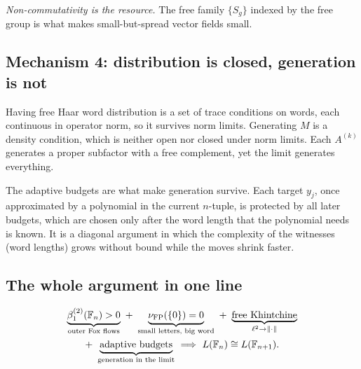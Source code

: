 \emph{Non-commutativity is the resource.} The free family $\{S_g\}$ indexed by the free group is what makes small-but-spread vector fields
small.

\subsection{Mechanism 4: distribution is closed, generation is not}
Having free Haar word distribution is a set of trace conditions on words, each continuous in operator norm, so it survives norm limits.
Generating $M$ is a density condition, which is neither open nor closed under norm limits. Each $A^{(k)}$ generates a proper subfactor with a
free complement, yet the limit generates everything.

The adaptive budgets are what make generation survive. Each target $y_j$, once approximated by a polynomial in the current $n$-tuple, is
protected by all later budgets, which are chosen only after the word length that the polynomial needs is known. It is a diagonal argument in
which the complexity of the witnesses (word lengths) grows without bound while the moves shrink faster.

\subsection{The whole argument in one line}
\begin{multline*}
\underbrace{\beta^{(2)}_1(\F_n)>0}_{\text{outer Fox flows}}\ +\ \underbrace{\nu_{\rm FP}(\{0\})=0}_{\text{small letters, big word}}\ +\ \underbrace{\text{free Khintchine}}_{\ell^2\to\|\cdot\|}\\
+\ \underbrace{\text{adaptive budgets}}_{\text{generation in the limit}}\ \Longrightarrow\ L(\F_n)\cong L(\F_{n+1}).
\end{multline*}
